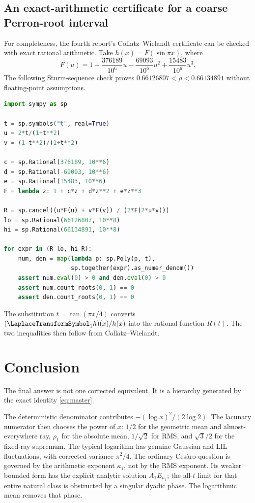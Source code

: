 \documentclass[11pt,oneside]{article}
\theoremstyle{definition}
\theoremstyle{remark}
\begin{document}
\subsection{An exact-arithmetic certificate for a coarse Perron-root interval}

For completeness, the fourth report's Collatz--Wielandt certificate can be
checked with exact rational arithmetic.  Take
$h(x)=F(\sin\pi x)$, where
\[
 F(u)=1+\frac{376189}{10^6}u-\frac{69093}{10^6}u^2
      +\frac{15483}{10^6}u^3.
\]
The following Sturm-sequence check proves
$0.66126807<\rho<0.66134891$ without floating-point assumptions.

\begin{lstlisting}[style=code,language=Python]
import sympy as sp

t = sp.symbols("t", real=True)
u = 2*t/(1+t**2)
v = (1-t**2)/(1+t**2)

c = sp.Rational(376189, 10**6)
d = sp.Rational(-69093, 10**6)
e = sp.Rational(15483, 10**6)
F = lambda z: 1 + c*z + d*z**2 + e*z**3

R = sp.cancel((u*F(u) + v*F(v)) / (2*F(2*u*v)))
lo = sp.Rational(66126807, 10**8)
hi = sp.Rational(66134891, 10**8)

for expr in (R-lo, hi-R):
    num, den = map(lambda p: sp.Poly(p, t),
                   sp.together(expr).as_numer_denom())
    assert num.eval(0) > 0 and den.eval(0) > 0
    assert num.count_roots(0, 1) == 0
    assert den.count_roots(0, 1) == 0
\end{lstlisting}
The substitution $t=\tan(\pi x/4)$ converts
$(\LaplaceTransformSymbol_1h)(x)/h(x)$ into the rational function $R(t)$.  The two inequalities
then follow from Collatz--Wielandt.

\section{Conclusion}
\label{sec:conclusion}

The final answer is not one corrected equivalent.  It is a hierarchy generated
by the exact identity \eqref{eq:master}.

The deterministic denominator contributes
$-(\log x)^2/(2\log2)$.  The lacunary numerator then chooses the power of $x$:
$1/2$ for the geometric mean and almost-everywhere ray, $\rho_1$ for the
absolute mean, $1/\sqrt2$ for RMS, and $\sqrt3/2$ for the fixed-ray supremum.
The typical logarithm has genuine Gaussian and LIL fluctuations, with corrected
variance $\pi^2/4$.  The ordinary Ces\`aro question is governed by the
arithmetic exponent $\kappa_1$, not by the RMS exponent.  Its weaker bounded
form has the explicit analytic solution $A_1E_{\kappa_1}$; the all-$t$ limit
for that entire natural class is obstructed by a singular dyadic phase.  The
logarithmic mean removes that phase.
\end{document}
